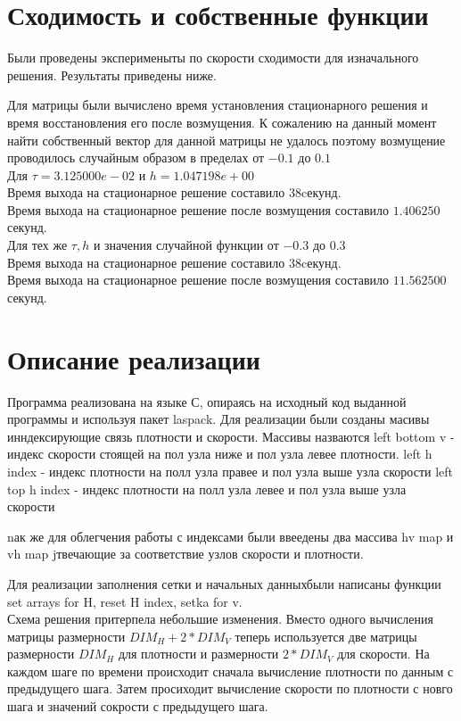 \documentclass[a4paper, 25pt]{article}
\begin{document}
\section{Сходимость и собственные функции}
Были проведены эксперименыты по скорости сходимости для изначального решения. Результаты приведены ниже.

Для матрицы были вычислено время установления стационарного решения и время восстановления его после возмущения.
К сожалению на данный момент найти собственный вектор для данной матрицы не удалось поэтому возмущение проводилось случайным образом в пределах от $-0.1$ до $ 0.1$ \\
Для $\tau = 3.125000e-02$ и $ h = 1.047198e+00 $ \\
Время выхода на стационарное решение составило $38$cекунд.\\
Время выхода на стационарное решение после возмущения составило $1.406250$ секунд.\\
Для тех же $\tau, h$ и значения случайной функции от $-0.3$ до $ 0.3$ \\
Время выхода на стационарное решение составило $38$cекунд.\\
Время выхода на стационарное решение после возмущения составило $11.562500$ секунд.\\
\section{Описание реализации}
Программа реализована на языке С, опираясь на исходный код выданной программы и используя пакет laspack.
Для реализации были созданы масивы инндексирующие связь плотности и скорости. Массивы назваются left bottom v - индекс скорости стоящей на пол узла ниже и пол узла левее плотности.
left h index -  индекс плотности на полл узла правее и пол узла выше узла скорости
left top h index -  индекс плотности на полл узла левее и пол узла выше узла скорости

nак же для облегчения работы с индексами были ввеедены два массива hv map и vh map jтвечающие за соответствие узлов скорости и плотности.

Для реализации заполнения сетки и начальных данныхбыли написаны функции set arrays for H, reset H index, setka for v.\\
Схема решения притерпела небольшие изменения. Вместо одного вычисления матрицы размерности $DIM_H + 2 * DIM_V$ теперь используется две матрицы размерности $DIM_H$ для плотности  и размерности $2 * DIM_V$ для скорости. На каждом шаге по времени происходит сначала вычисление плотности по данным с предыдущего шага. Затем просиходит вычисление скорости по плотности с новго шага и значений сокрости с предыдущего шага. 
\end{document}
